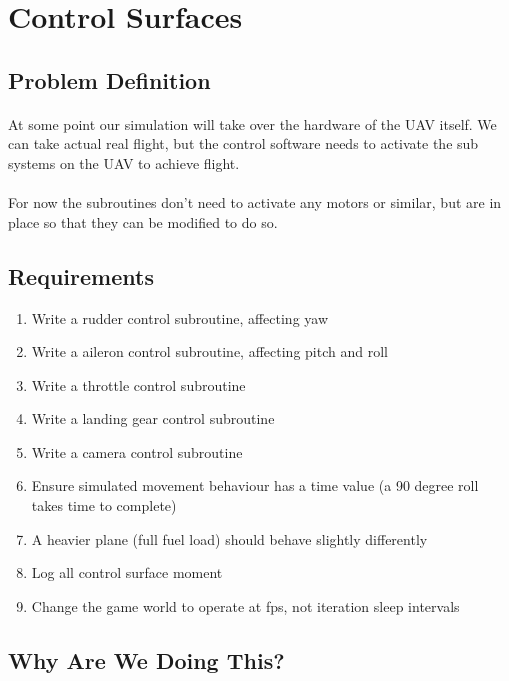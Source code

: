\documentclass[11pt]{book}
\begin{document}
\clearpage

\section{Control Surfaces}

\subsection{Problem Definition}

\paragraph{} At some point our simulation will take over the hardware of the
UAV itself. We can take actual real flight, but the control software needs to
activate the sub systems on the UAV to achieve flight.

\paragraph{} For now the subroutines don't need to activate any motors or
similar, but are in place so that they can be modified to do so.

\subsection{Requirements}

\begin{enumerate}
\item Write a rudder control subroutine, affecting yaw
\item Write a aileron control subroutine, affecting pitch and roll
\item Write a throttle control subroutine
\item Write a landing gear control subroutine
\item Write a camera control subroutine
\item Ensure simulated movement behaviour has a time value (a 90 degree roll takes time to complete)
\item A heavier plane (full fuel load) should behave slightly differently
\item Log all control surface moment
\item Change the game world to operate at fps, not iteration sleep intervals
\end{enumerate}

\subsection{Why Are We Doing This?}
\end{document}
